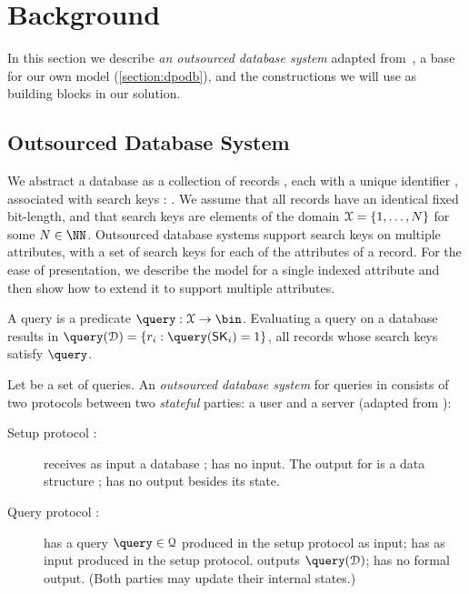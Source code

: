 \section{Background}\label{section:background}

	In this section we describe \emph{an outsourced database system} adapted from~\cite{generic-attacks-kellaris}, a base for our own model (\cref{section:dpodb}), and the constructions we will use as building blocks in our solution.

	\subsection{Outsourced Database System}

		We abstract a database as a collection of \dataSize{} records \record{}, each with a unique identifier \recordID{}, associated with search keys \searchKey{}: \databaseDef{}.
		We assume that all records have an identical fixed bit-length, and that search keys are elements of the domain $\mathcal{X} = \{ 1, \ldots, N \}$ for some $\domainSize \in \NN$.
		Outsourced database systems support search keys on multiple attributes, with a set of search keys for each of the attributes of a record.
		For the ease of presentation, we describe the model for a single indexed attribute and then show how to extend it to support multiple attributes.

		A query is a predicate $\query: \searchKeyDomain \to \bin$.
		Evaluating a query \query{} on a database \database{} results in $\query( \database ) = \{ \record_i : \query( \searchKey_i ) = 1 \}$, all records whose search keys satisfy $\query$.

		Let \querySet{} be a set of queries.
		An \emph{outsourced database system} for queries in \querySet{} consists of two protocols between two \emph{stateful} parties: a user \user{} and a server \server{} (adapted from \cite{generic-attacks-kellaris}): %
		\begin{description}
			\item[Setup protocol \protocolSetup{}:]
				\user{} receives as input a database \databaseDef{}; \server{} has no input.
				The output for \server{} is a data structure \serverDS{}; \user{} has no output besides its state.

			\item[Query protocol \protocolQuery{}:]
				\user{} has a query $\query \in \querySet$ produced in the setup protocol as input; \server{} has as input \serverDS{} produced in the setup protocol.
				\user{} outputs $\query( \database )$; \server{} has no formal output.
				(Both parties may update their internal states.)
		\end{description}

